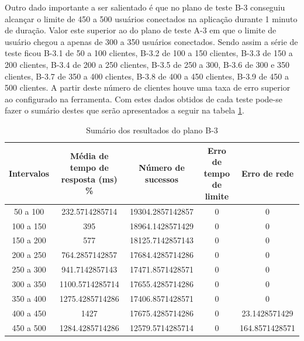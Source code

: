  Outro dado importante a ser salientado é que no plano de teste B-3 conseguiu alcançar o limite de 450 a 500 usuários conectados
  na aplicação durante 1 minuto de duração. Valor este superior ao do plano de teste A-3 em que o limite de usuário chegou a apenas
  de 300 a 350 usuários conectados. Sendo assim a série de teste ficou B-3.1 de 50 a 100 clientes, B-3.2 de 100 a 150 clientes, 
  B-3.3 de 150 a 200 clientes, B-3.4 de 200 a 250 clientes, B-3.5 de 250 a 300, B-3.6 de 300 e 350 clientes, B-3.7 de 350 a 400 clientes,
  B-3.8 de 400 a 450 clientes, B-3.9 de 450 a 500 clientes. A partir deste número de clientes houve uma taxa de erro superior ao
  configurado na ferramenta. Com estes dados obtidos de cada teste pode-se fazer o sumário
  destes que serão apresentados a seguir na tabela \ref{tab:sumario-resultado-plano-teste-b-3}.
  
  \begin{table}[H]
    \centering
    \footnotesize
    \setlength{\abovecaptionskip}{0pt}
    \setlength{\belowcaptionskip}{0pt}
    \caption[Sumário dos resultados do plano B-3]{Sumário dos resultados do plano B-3}
    \label{tab:sumario-resultado-plano-teste-b-3}
    \begin{tabular}{c|c|c|c|c}
      \hline \hline
      Intervalos  & 	Média de tempo de resposta (ms) \% &	Número de sucessos & 	Erro de tempo de limite &	Erro de rede \\ 
      \hline \hline
      50 a 100 &		232.5714285714  &		19304.2857142857 & 	0 &				0 \\
      100 a 150&		395		&		18964.1428571429 & 	0  &				0 \\
      150 a 200&		577		&		18125.7142857143 & 	0 &				0 \\
      200 a 250&		764.2857142857  &		17684.4285714286 & 	0 &				0 \\
      250 a 300&		941.7142857143  &		17471.8571428571 & 	0 &				0 \\
      300 a 350&		1100.5714285714 &		17655.4285714286 & 	0 &				0 \\
      350 a 400&		1275.4285714286 &		17406.8571428571 & 	0 &				0 \\
      400 a 450&		1427		&		17675.4285714286 & 	0 &				23.1428571429 \\
      450 a 500&		1284.4285714286 &		12579.5714285714 & 	0 &				164.8571428571 \\
      \hline \hline
    \end{tabular}
  \end{table}
   
